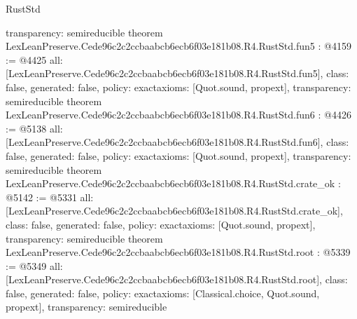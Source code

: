 \begin{lexlean}{RustStd}
\begin{coremodule}
{  transparency: semireducible
}
theorem LexLeanPreserve.Cede96c2c2ccbaabcb6ecb6f03e181b08.R4.RustStd.fun5 : @4159 := @4425 {
  all: [LexLeanPreserve.Cede96c2c2ccbaabcb6ecb6f03e181b08.R4.RustStd.fun5],
  class: false,
  generated: false,
  policy: exact{axioms: [Quot.sound, propext]},
  transparency: semireducible
}
theorem LexLeanPreserve.Cede96c2c2ccbaabcb6ecb6f03e181b08.R4.RustStd.fun6 : @4426 := @5138 {
  all: [LexLeanPreserve.Cede96c2c2ccbaabcb6ecb6f03e181b08.R4.RustStd.fun6],
  class: false,
  generated: false,
  policy: exact{axioms: [Quot.sound, propext]},
  transparency: semireducible
}
theorem LexLeanPreserve.Cede96c2c2ccbaabcb6ecb6f03e181b08.R4.RustStd.crate_ok : @5142 := @5331 {
  all: [LexLeanPreserve.Cede96c2c2ccbaabcb6ecb6f03e181b08.R4.RustStd.crate_ok],
  class: false,
  generated: false,
  policy: exact{axioms: [Quot.sound, propext]},
  transparency: semireducible
}
theorem LexLeanPreserve.Cede96c2c2ccbaabcb6ecb6f03e181b08.R4.RustStd.root : @5339 := @5349 {
  all: [LexLeanPreserve.Cede96c2c2ccbaabcb6ecb6f03e181b08.R4.RustStd.root],
  class: false,
  generated: false,
  policy: exact{axioms: [Classical.choice, Quot.sound, propext]},
  transparency: semireducible
}


\end{coremodule}
\end{lexlean}
